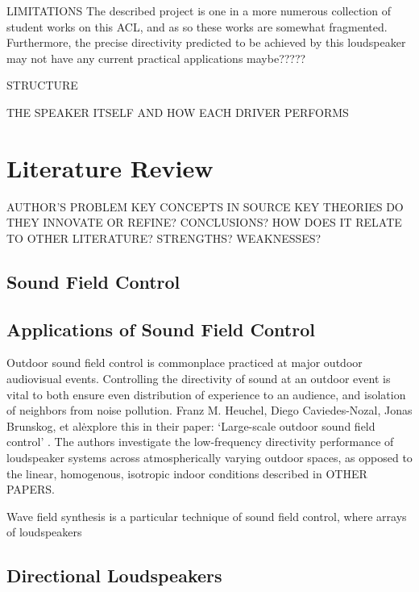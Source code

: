 \documentclass{report}
\begin{document}
    LIMITATIONS
    The described project is one in a more numerous collection of student works on this ACL, and as so these works are somewhat fragmented.
    Furthermore, the precise directivity predicted to be achieved by this loudspeaker may not have any current practical applications maybe?????

    STRUCTURE

    THE SPEAKER ITSELF AND HOW EACH DRIVER PERFORMS



\chapter{Literature Review}
    AUTHOR'S PROBLEM
    KEY CONCEPTS IN SOURCE
    KEY THEORIES
    DO THEY INNOVATE OR REFINE?
    CONCLUSIONS?
    HOW DOES IT RELATE TO OTHER LITERATURE?
    STRENGTHS?
    WEAKNESSES?

    \section{Sound Field Control}
        

    \section{Applications of Sound Field Control}

        Outdoor sound field control is commonplace practiced at major outdoor audiovisual events.
        Controlling the directivity of sound at an outdoor event is vital to both ensure even distribution of experience to an audience, and isolation of neighbors from noise pollution.
        Franz M. Heuchel, Diego Caviedes-Nozal, Jonas Brunskog, et al\. explore this in their paper: `Large-scale outdoor sound field control' \cite{heuchel2020large}.
        The authors investigate the low-frequency directivity performance of loudspeaker systems across atmospherically varying outdoor spaces, as opposed to the linear, homogenous, isotropic indoor conditions described in OTHER PAPERS.



        Wave field synthesis is a particular technique of sound field control, where arrays of loudspeakers 



    \section{Directional Loudspeakers}
\end{document}
